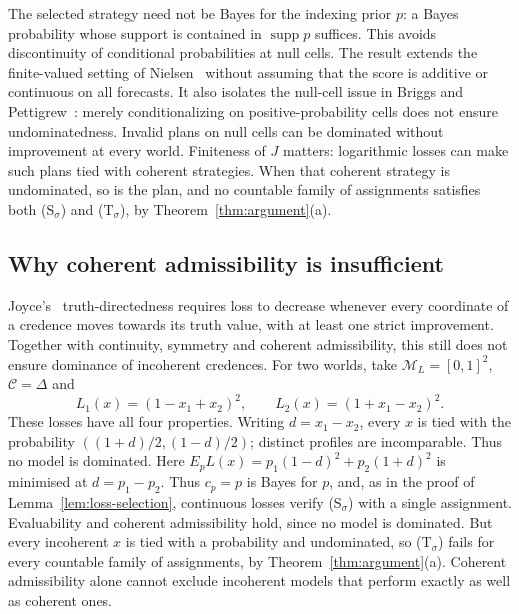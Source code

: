 \documentclass[11pt]{article}
\theoremstyle{definition}
\theoremstyle{remark}
\newcommand{\M}{\mathcal M}
\newcommand{\C}{\mathcal C}
\newcommand{\supp}{\operatorname{supp}}
\begin{document}
The selected strategy need not be Bayes for the indexing prior $p$: a Bayes probability whose support is contained in $\supp p$ suffices. This avoids discontinuity of conditional probabilities at null cells. The result extends the finite-valued setting of Nielsen~\cite{Nielsen2021} without assuming that the score is additive or continuous on all forecasts. It also isolates the null-cell issue in Briggs and Pettigrew~\cite{Briggs2020}: merely conditionalizing on positive-probability cells does not ensure undominatedness. Invalid plans on null cells can be dominated without improvement at every world. Finiteness of $J$ matters: logarithmic losses can make such plans tied with coherent strategies. When that coherent strategy is undominated, so is the plan, and no countable family of assignments satisfies both (S$_\sigma$) and (T$_\sigma$), by Theorem~\ref{thm:argument}(a).

\subsection{Why coherent admissibility is insufficient}
Joyce's~\cite{Joyce2009} truth-directedness requires loss to decrease whenever every coordinate of a credence moves towards its truth value, with at least one strict improvement. Together with continuity, symmetry and coherent admissibility, this still does not ensure dominance of incoherent credences. For two worlds, take $\M_L=[0,1]^2$, $\C=\Delta$ and
\[
L_1(x)=(1-x_1+x_2)^2,\qquad L_2(x)=(1+x_1-x_2)^2.
\]
These losses have all four properties. Writing $d=x_1-x_2$, every $x$ is tied with the probability $((1+d)/2,(1-d)/2)$; distinct profiles are incomparable. Thus no model is dominated. Here $E_pL(x)=p_1(1-d)^2+p_2(1+d)^2$ is minimised at $d=p_1-p_2$. Thus $c_p=p$ is Bayes for $p$, and, as in the proof of Lemma~\ref{lem:loss-selection}, continuous losses verify (S$_\sigma$) with a single assignment. Evaluability and coherent admissibility hold, since no model is dominated. But every incoherent $x$ is tied with a probability and undominated, so (T$_\sigma$) fails for every countable family of assignments, by Theorem~\ref{thm:argument}(a). Coherent admissibility alone cannot exclude incoherent models that perform exactly as well as coherent ones.
\end{document}
